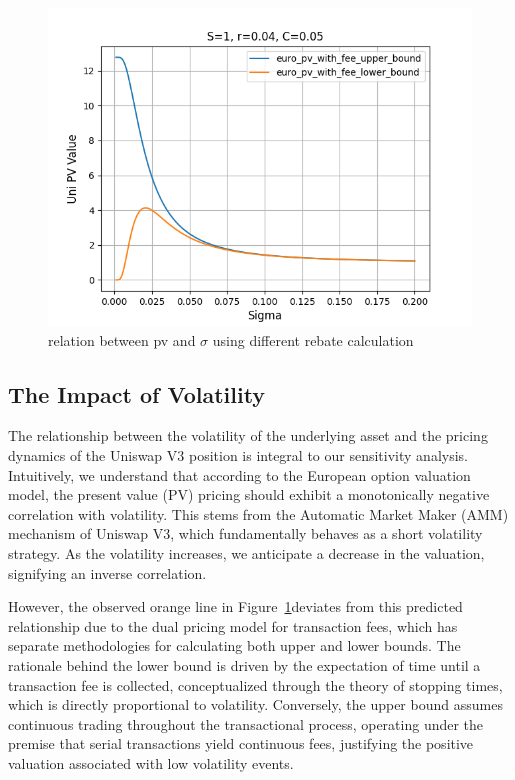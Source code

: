 \documentclass[conference]{IEEEtran}
\begin{document}
\begin{figure}
    \centering
    \includegraphics[width=1\linewidth]{figures/different-rebate-cal-method-comparison.png}
    \caption{relation between pv and $\sigma$ using different rebate calculation}
    \label{fig:rebate_comparison}
\end{figure}


\subsection{The Impact of Volatility}
The relationship between the volatility of the underlying asset and the pricing dynamics of the Uniswap V3 position is integral to our sensitivity analysis. Intuitively, we understand that according to the European option valuation model, the present value (PV) pricing should exhibit a monotonically negative correlation with volatility. This stems from the Automatic Market Maker (AMM) mechanism of Uniswap V3, which fundamentally behaves as a short volatility strategy. As the volatility increases, we anticipate a decrease in the valuation, signifying an inverse correlation.

However, the observed orange line in Figure~\ref{fig:rebate_comparison}deviates from this predicted relationship due to the dual pricing model for transaction fees, which has separate methodologies for calculating both upper and lower bounds. The rationale behind the lower bound is driven by the expectation of time until a transaction fee is collected, conceptualized through the theory of stopping times, which is directly proportional to volatility. Conversely, the upper bound assumes continuous trading throughout the transactional process, operating under the premise that serial transactions yield continuous fees, justifying the positive valuation associated with low volatility events.
\end{document}
